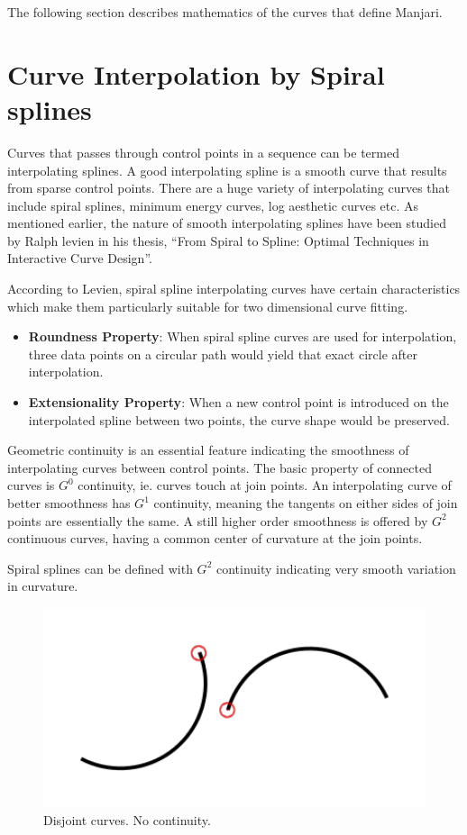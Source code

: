 \documentclass[11pt,twoside,a4paper]{article}
\begin{document}
 The following section describes mathematics of the curves that define Manjari. 
 


\section{Curve Interpolation by Spiral splines}

Curves that passes through control points in a sequence can be termed interpolating splines. A good interpolating spline is a smooth curve that results from sparse control points. There are a huge variety of interpolating curves that include spiral splines, minimum energy curves, log aesthetic curves etc. As mentioned earlier, the nature of smooth interpolating splines have been studied by Ralph levien in his thesis, ``From Spiral to Spline: Optimal Techniques in Interactive Curve Design”\cite{levien}.

According to Levien, spiral spline interpolating curves have certain characteristics which make them particularly suitable for two dimensional curve fitting.
\begin{itemize}
	
	\item \textbf{Roundness Property}: When spiral spline curves are used for interpolation, three data points on a circular path would yield that exact circle after interpolation.
	\item \textbf{Extensionality Property}: When a new control point is introduced on the interpolated spline between two points, the curve shape would be preserved.
\end{itemize}

Geometric continuity is an essential feature indicating the smoothness of interpolating curves between control points. The basic property of connected curves is $G^0$ continuity, ie. curves touch at join points. An interpolating curve of better smoothness has $G^1$ continuity, meaning the tangents on either sides of join points are essentially the same. A still higher order smoothness is offered by $G^2$ continuous curves, having a common center of curvature at the join points. 

Spiral splines can be defined with $G^2$ continuity indicating very smooth variation in curvature. 

\begin{figure}[h!]
	\includegraphics[width=1.0\textwidth]{images/disjoint.png}
	\caption{Disjoint curves. No continuity.}
	\label{disjoint}
\end{figure}
\end{document}
